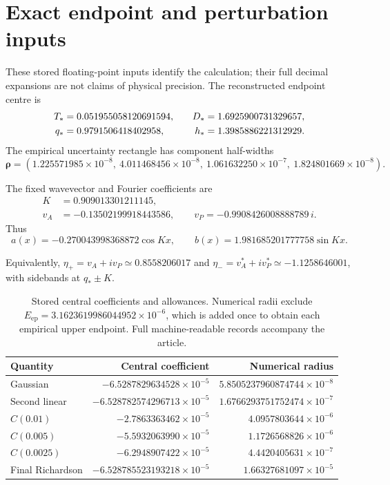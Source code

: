 \section{Exact endpoint and perturbation inputs}\label{app:inputs}
These stored floating-point inputs identify the calculation; their full decimal expansions are not claims of physical precision. The reconstructed endpoint centre is
\begin{equation}\label{eq:coords}
 \begin{aligned}
 T_*&=0.051955058120691594,&\quad D_*&=1.6925900731329657,\\
 q_*&=0.9791506418402958,&h_*&=1.3985886221312929.
 \end{aligned}
\end{equation}
The empirical uncertainty rectangle has component half-widths
\begin{equation}\label{eq:rho}
 \bm\rho=(1.225571985\times10^{-8},\ 4.011468456\times10^{-8},
 \ 1.061632250\times10^{-7},\ 1.824801669\times10^{-8}).
\end{equation}

The fixed wavevector and Fourier coefficients are
\begin{align}\label{eq:witness}
 K&=0.909013301211145,\\
 v_A&=-0.13502199918443586,\qquad
 v_P=-0.9908426008888789\,i.
\end{align}
Thus
\begin{equation}\label{eq:profile}
 a(x)=-0.270043998368872\cos Kx,\qquad
 b(x)=1.981685201777758\sin Kx.
\end{equation}

Equivalently, $\eta_+=v_A+iv_P\simeq0.8558206017$ and $\eta_-=v_A^*+iv_P^*\simeq-1.1258646001$, with sidebands at $q_*\pm K$.

\begin{table}[tbp]\centering
\caption{Stored central coefficients and allowances. Numerical radii exclude $E_{\mathrm{ep}}=3.1623619986044952\times10^{-6}$, which is added once to obtain each empirical upper endpoint. Full machine-readable records accompany the article.}\label{tab:rawresults}
\begin{tabular}{lrr}\toprule
Quantity & Central coefficient & Numerical radius\\\midrule
Gaussian & $-6.5287829634528\times10^{-5}$ & $5.8505237960874744\times10^{-8}$\\
Second linear & $-6.528782574296713\times10^{-5}$ & $1.6766293751752474\times10^{-7}$\\
$C(0.01)$ & $-2.7863363462\times10^{-5}$ & $4.0957803644\times10^{-6}$\\
$C(0.005)$ & $-5.5932063990\times10^{-5}$ & $1.1726568826\times10^{-6}$\\
$C(0.0025)$ & $-6.2948907422\times10^{-5}$ & $4.4420405631\times10^{-7}$\\
Final Richardson & $-6.528785523193218\times10^{-5}$ & $1.66327681097\times10^{-5}$\\\bottomrule
\end{tabular}
\end{table}

